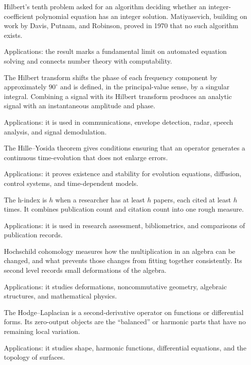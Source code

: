 Hilbert's tenth problem asked for an algorithm deciding whether an integer-coefficient polynomial equation has an integer solution. Matiyasevich, building on work by Davis, Putnam, and Robinson, proved in 1970 that no such algorithm exists. \par\noindent Applications: the result marks a fundamental limit on automated equation solving and connects number theory with computability.

The Hilbert transform shifts the phase of each frequency component by approximately $90^\circ$ and is defined, in the principal-value sense, by a singular integral. Combining a signal with its Hilbert transform produces an analytic signal with an instantaneous amplitude and phase. \par\noindent Applications: it is used in communications, envelope detection, radar, speech analysis, and signal demodulation.

The Hille--Yosida theorem gives conditions ensuring that an operator generates a continuous time-evolution that does not enlarge errors. \par\noindent Applications: it proves existence and stability for evolution equations, diffusion, control systems, and time-dependent models.

The h-index is $h$ when a researcher has at least $h$ papers, each cited at least $h$ times. It combines publication count and citation count into one rough measure. \par\noindent Applications: it is used in research assessment, bibliometrics, and comparisons of publication records.

Hochschild cohomology measures how the multiplication in an algebra can be changed, and what prevents those changes from fitting together consistently. Its second level records small deformations of the algebra. \par\noindent Applications: it studies deformations, noncommutative geometry, algebraic structures, and mathematical physics.

The Hodge--Laplacian is a second-derivative operator on functions or differential forms. Its zero-output objects are the “balanced” or harmonic parts that have no remaining local variation. \par\noindent Applications: it studies shape, harmonic functions, differential equations, and the topology of surfaces.

